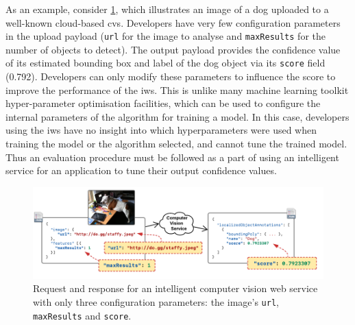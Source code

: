 As an example, consider \cref{fig:dog-example}, which illustrates an image of a dog uploaded to a well-known cloud-based \gls{cvs}. Developers have very few configuration parameters in the upload payload (\texttt{url} for the image to analyse and \texttt{maxResults} for the number of objects to detect). The  output payload provides the confidence value of its estimated bounding box and label of the dog object via its \texttt{score} field (0.792). Developers can only modify these parameters to influence the score to improve the performance of the \gls{iws}. This is unlike many machine learning toolkit hyper-parameter optimisation facilities, which can be used to configure the internal parameters of the algorithm for training a model. In this case, developers using the \gls{iws} have no insight into which hyperparameters were used when training the model or the algorithm selected, and cannot tune the trained model. Thus an evaluation procedure must be followed as a part of using an intelligent service for an application to tune their output confidence values. 

\begin{figure}[th]
    \includegraphics[width=\linewidth]{dog-example}
    \caption[Sample request and response for intelligent services]{Request and response for an intelligent computer vision web service with only three configuration parameters: the image's \texttt{url}, \texttt{maxResults} and \texttt{score}.}
    \label{fig:dog-example}
\end{figure}

